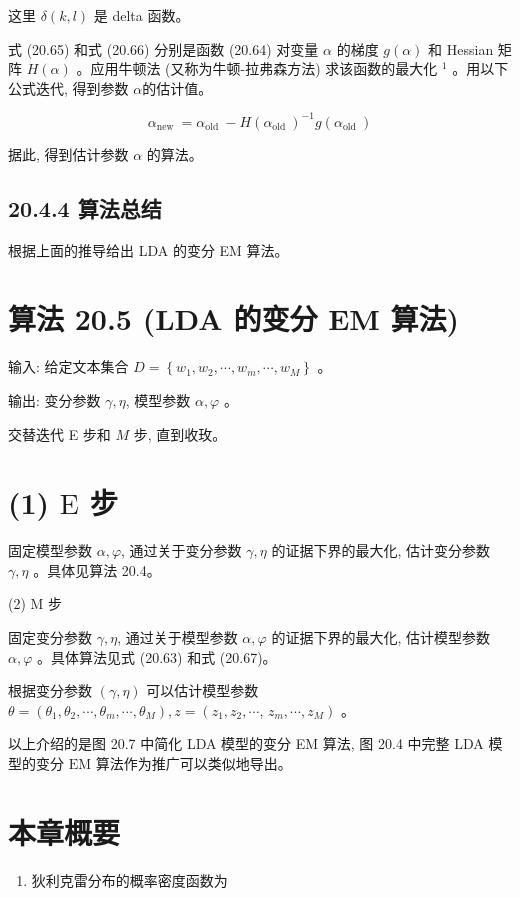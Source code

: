 \documentclass[10pt]{article}
\begin{document}
\begin{CJK*}{UTF8}{bsmi}
这里 $\delta(k, l)$ 是 delta 函数。

式 (20.65) 和式 (20.66) 分别是函数 (20.64) 对变量 $\alpha$ 的梯度 $g(\alpha)$ 和 Hessian 矩阵 $H(\alpha)$ 。应用牛顿法 (又称为牛顿-拉弗森方法) 求该函数的最大化 ${ }^{1}$ 。用以下公式迭代, 得到参数 $\alpha$的估计值。


\begin{equation*}
\alpha_{\text {new }}=\alpha_{\text {old }}-H\left(\alpha_{\text {old }}\right)^{-1} g\left(\alpha_{\text {old }}\right) \tag{20.68}
\end{equation*}


据此, 得到估计参数 $\alpha$ 的算法。

\subsection*{20.4.4 算法总结}
根据上面的推导给出 LDA 的变分 EM 算法。

\section*{算法 20.5 (LDA 的变分 EM 算法)}
输入: 给定文本集合 $D=\left\{w_{1}, w_{2}, \cdots, w_{m}, \cdots, w_{M}\right\}$ 。

输出: 变分参数 $\gamma, \eta$, 模型参数 $\alpha, \varphi$ 。

交替迭代 E 步和 $M$ 步, 直到收玫。

\section*{(1) $\mathrm{E}$ 步}
固定模型参数 $\alpha, \varphi$, 通过关于变分参数 $\gamma, \eta$ 的证据下界的最大化, 估计变分参数 $\gamma, \eta$ 。具体见算法 20.4。

(2) $\mathrm{M}$ 步

固定变分参数 $\gamma, \eta$, 通过关于模型参数 $\alpha, \varphi$ 的证据下界的最大化, 估计模型参数 $\alpha, \varphi$ 。具体算法见式 (20.63) 和式 (20.67)。

根据变分参数 $(\gamma, \eta)$ 可以估计模型参数 $\theta=\left(\theta_{1}, \theta_{2}, \cdots, \theta_{m}, \cdots, \theta_{M}\right), z=\left(z_{1}, z_{2}, \cdots\right.$, $\left.z_{m}, \cdots, z_{M}\right)$ 。

以上介绍的是图 20.7 中简化 LDA 模型的变分 EM 算法, 图 20.4 中完整 LDA 模型的变分 $\mathrm{EM}$ 算法作为推广可以类似地导出。

\section*{本章概要}
\begin{enumerate}
  \item 狄利克雷分布的概率密度函数为
\end{enumerate}


\end{CJK*}
\end{document}

